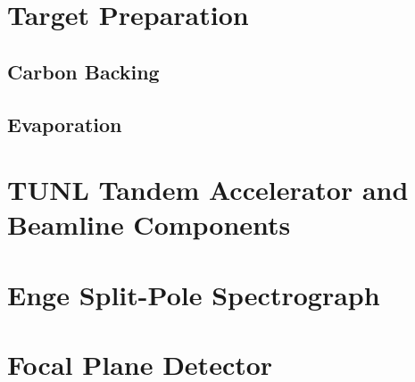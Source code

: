 \section{Target Preparation}

\subsection{Carbon Backing}

\subsection{Evaporation}

\section{TUNL Tandem Accelerator and Beamline Components}

\section{Enge Split-Pole Spectrograph}

\section{Focal Plane Detector}
